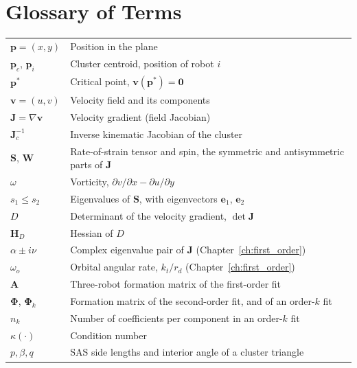 \documentclass[12pt, letterpaper, oneside]{report}
\begin{document}
\clearpage

\chapter*{Glossary of Terms}

\begin{table}[h]
\centering
\begin{tabular}{l p{4.2in}}
$\mathbf{p} = (x, y)$ & Position in the plane \\
$\mathbf{p}_c$, $\mathbf{p}_i$ & Cluster centroid, position of robot $i$ \\
$\mathbf{p}^*$ & Critical point, $\mathbf{v}(\mathbf{p}^*) = \mathbf{0}$ \\
$\mathbf{v} = (u, v)$ & Velocity field and its components \\
$\mathbf{J} = \nabla\mathbf{v}$ & Velocity gradient (field Jacobian) \\
$\mathbf{J}_c^{-1}$ & Inverse kinematic Jacobian of the cluster \\
$\mathbf{S}$, $\mathbf{W}$ & Rate-of-strain tensor and spin, the symmetric and antisymmetric parts of $\mathbf{J}$ \\
$\omega$ & Vorticity, $\partial v/\partial x - \partial u/\partial y$ \\
$s_1 \leq s_2$ & Eigenvalues of $\mathbf{S}$, with eigenvectors $\mathbf{e}_1$, $\mathbf{e}_2$ \\
$D$ & Determinant of the velocity gradient, $\det\mathbf{J}$ \\
$\mathbf{H}_D$ & Hessian of $D$ \\
$\alpha \pm i\nu$ & Complex eigenvalue pair of $\mathbf{J}$ (Chapter~\ref{ch:first_order}) \\
$\omega_o$ & Orbital angular rate, $k_t/r_d$ (Chapter~\ref{ch:first_order}) \\
$\mathbf{A}$ & Three-robot formation matrix of the first-order fit \\
$\boldsymbol{\Phi}$, $\boldsymbol{\Phi}_k$ & Formation matrix of the second-order fit, and of an order-$k$ fit \\
$n_k$ & Number of coefficients per component in an order-$k$ fit \\
$\kappa(\cdot)$ & Condition number \\
$p, \beta, q$ & SAS side lengths and interior angle of a cluster triangle \\

\end{tabular}
\end{table}
\end{document}
